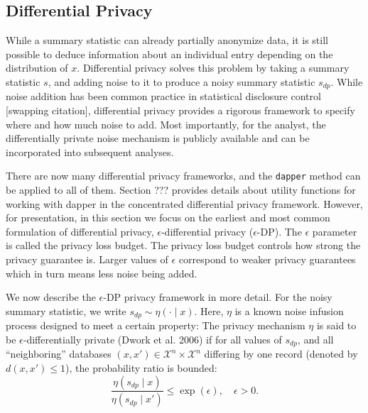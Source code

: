 \hypertarget{differential-privacy}{%
\subsection{Differential Privacy}\label{differential-privacy}}

While a summary statistic can already partially anonymize data, it is still
possible to deduce information about an individual entry depending on
the distribution of \(x\). Differential privacy
solves this problem by taking a summary statistic \(s\), and adding noise to it to produce a noisy summary statistic \(s_{dp}\).
While noise addition has
been common practice in statistical disclosure control {[}swapping citation{]}, differential privacy
provides a rigorous framework to specify where and how much
noise to add. Most importantly, for the analyst, the differentially private noise mechanism is publicly
available and can be incorporated into subsequent analyses.

There are now many differential privacy frameworks, and the \texttt{dapper} method can be applied to
all of them. Section ??? provides details about utility functions for working with dapper
in the concentrated differential privacy framework. However, for presentation,
in this section we focus on the earliest and most common
formulation of differential privacy, \(\epsilon\)-differential privacy (\(\epsilon\)-DP). The
\(\epsilon\) parameter is called the privacy loss budget. The privacy loss budget controls how
strong the privacy guarantee is. Larger values of \(\epsilon\) correspond to weaker
privacy guarantees which in turn means less noise being added.

We now describe the \(\epsilon\)-DP privacy framework in more detail. For the noisy summary
statistic, we write \(s_{dp} \sim \eta(\cdot \mid x)\). Here,
\(\eta\) is a known noise infusion process designed to meet a certain property: The privacy mechanism
\(\eta\) is said to be \(\epsilon\)-differentially private (Dwork et al. 2006) if for all values of
\(s_{dp}\), and all ``neighboring'' databases \((x,x') \in \mathcal{X}^n \times \mathcal{X}^n\) differing
by one record (denoted by \(d(x,x') \leq 1\)), the probability ratio is bounded:
\[
\dfrac{\eta(s_{dp} \mid x)}{\eta(s_{dp} \mid x')} \leq \exp(\epsilon), \quad \epsilon > 0.
\]

